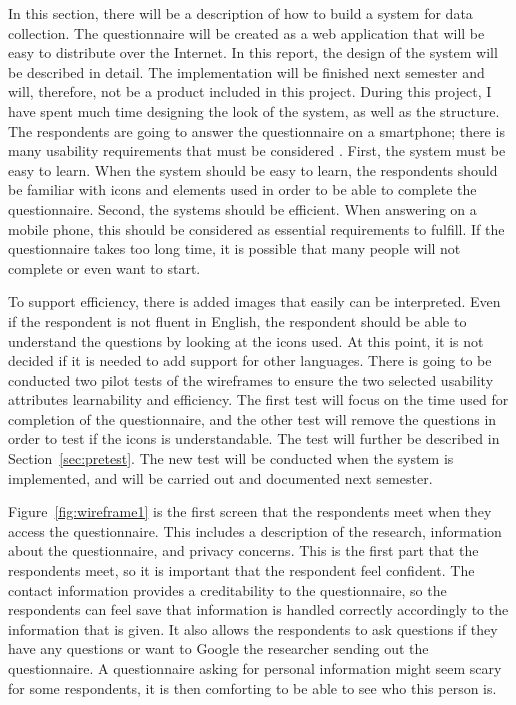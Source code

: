   In this section, there will be a description of how to build a system for data collection. The questionnaire will be created as a web application that will be easy to distribute over the Internet. In this report, the design of the system will be described in detail. The implementation will be finished next semester and will, therefore, not be a product included in this project. During this project, I have spent much time designing the look of the system, as well as the structure. The respondents are going to answer the questionnaire on a smartphone; there is many usability requirements that must be considered \cite{ISO9241}. First, the system must be easy to learn. When the system should be easy to learn, the respondents should be familiar with icons and elements used in order to be able to complete the questionnaire. Second, the systems should be efficient. When answering on a mobile phone, this should be considered as essential requirements to fulfill. If the questionnaire takes too long time, it is possible that many people will not complete or even want to start.

  To support efficiency, there is added images that easily can be interpreted. Even if the respondent is not fluent in English, the respondent should be able to understand the questions by looking at the icons used. At this point, it is not decided if it is needed to add support for other languages. There is going to be conducted two pilot tests of the wireframes to ensure the two selected usability attributes learnability and efficiency. The first test will focus on the time used for completion of the questionnaire, and the other test will remove the questions in order to test if the icons is understandable. The test will further be described in Section~\ref{sec:pretest}. The new test will be conducted when the system is implemented, and will be carried out and documented next semester.


  Figure~\ref{fig:wireframe1} is the first screen that the respondents meet when they access the questionnaire. This includes a description of the research, information about the questionnaire, and privacy concerns. This is the first part that the respondents meet, so it is important that the respondent feel confident. The contact information provides a creditability to the questionnaire, so the respondents can feel save that information is handled correctly accordingly to the information that is given. It also allows the respondents to ask questions if they have any questions or want to Google the researcher sending out the questionnaire. A questionnaire asking for personal information might seem scary for some respondents, it is then comforting to be able to see who this person is.

